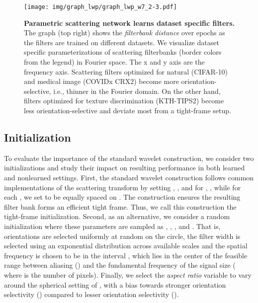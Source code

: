 \documentclass[10pt,twocolumn,letterpaper]{article}
\begin{document}
\begin{figure*}[t]
    \centering
    \texttt{[image: img/graph\_lwp/graph\_lwp\_w7\_2-3.pdf]} 
    \vspace{-7pt}
    \caption{\textbf{Parametric scattering network learns dataset specific filters.} The graph (top right) shows the \textit{filterbank distance} over epochs as the filters are trained on different datasets. We visualize dataset specific parameterizations of scattering filterbanks (border colors from the legend) in Fourier space.  The x and y axis are the frequency axis. Scattering filters optimized for natural (CIFAR-10) and medical image (COVIDx CRX2) become more orientation-selective, i.e., thinner in the Fourier domain. On the other hand, filters optimized for texture discrimination (KTH-TIPS2) become less orientation-selective and deviate most from a tight-frame setup.\vspace{-10pt}}
    \label{fig:graphlwp}
\end{figure*}

\subsection{Initialization}
\label{sec:init}
To evaluate the importance of the standard wavelet construction, we consider two initializations and study their impact on resulting performance in both learned and nonlearned settings. First, the standard wavelet construction follows common implementations of the scattering transform by setting , , and  for , , while for each , we set  to be equally spaced on . The construction ensures the resulting filter bank forms an efficient tight frame. Thus, we call this construction the tight-frame initialization. Second, as an alternative, we consider a random initialization where these parameters are sampled as , , , and . That is, orientations are selected uniformly at random on the circle, the filter width  is selected using an exponential distribution across available scales and the spatial frequency  is chosen to be in the interval , which lies in the center of the feasible range between aliasing () and the fundamental frequency of the signal size ( where  is the number of pixels). Finally, we select the \textit{aspect ratio} variable to vary around the spherical setting of , with a bias towards stronger orientation selectivity () compared to lesser orientation selectivity ().
\vspace{-3pt}
\end{document}
